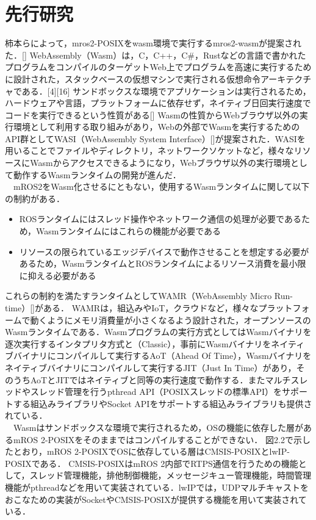 \chapter{先行研究}
柿本らによって，mros2-POSIXをwasm環境で実行するmros2-wasmが提案された．[]
WebAssembly（Wasm）は，C，C++，C\#，Rustなどの言語で書かれたプログラムをコンパイルのターゲットWeb上でプログラムを高速に実行するために設計された，スタックベースの仮想マシンで実行される仮想命令アーキテクチャである．[4][16]
サンドボックスな環境でアプリケーションは実行されるため，ハードウェアや言語，プラットフォームに依存せず，ネイティブ日回実行速度でコードを実行できるという性質がある[]
Wasmの性質からWebブラウザ以外の実行環境として利用する取り組みがあり，Webの外部でWasmを実行するためのAPI群としてWASI（WebAssembly System Interface）[]が提案された．WASIを用いることでファイルやディレクトリ，ネットワークソケットなど，様々なリソースにWasmからアクセスできるようになり，Webブラウザ以外の実行環境として動作するWasmランタイムの開発が進んだ．
\\　mROS2をWasm化させるにともない，使用するWasmランタイムに関して以下の制約がある．
\begin{itemize}
    \item ROSランタイムにはスレッド操作やネットワーク通信の処理が必要であるため，Wasmランタイムにはこれらの機能が必要である
    \item リソースの限られているエッジデバイスで動作させることを想定する必要があるため，WasmランタイムとROSランタイムによるリソース消費を最小限に抑える必要がある
\end{itemize}
これらの制約を満たすランタイムとしてWAMR（WebAssembly Micro Run-time）[]がある．
WAMRは，組込みやIoT，クラウドなど，様々なプラットフォームで動くようにメモリ消費量が小さくなるよう設計された，オープンソースのWasmランタイムである．Wasmプログラムの実行方式としてはWasmバイナリを逐次実行するインタプリタ方式と（Classic），事前にWasmバイナリをネイティブバイナリにコンパイルして実行するAoT（Ahead Of Time），Wasmバイナリをネイティブバイナリにコンパイルして実行するJIT（Just In Time）があり，そのうちAoTとJITではネイティブと同等の実行速度で動作する．またマルチスレッドやスレッド管理を行うpthread API（POSIXスレッドの標準API）をサポートする組込みライブラリやSocket APIをサポートする組込みライブラリも提供されている．\\　Wasmはサンドボックスな環境で実行されるため，OSの機能に依存した層があるmROS 2-POSIXをそのままではコンパイルすることができない．
図2.2で示したとおり，mROS 2-POSIXでOSに依存している層はCMSIS-POSIXとlwIP-POSIXである．
CMSIS-POSIXはmROS 2内部でRTPS通信を行うための機能として，スレッド管理機能，排他制御機能，メッセージキュー管理機能，時間管理機能がpthreadなどを用いて実装されている．lwIPでは，UDPマルチキャストをおこなための実装がSocketやCMSIS-POSIXが提供する機能を用いて実装されている．
